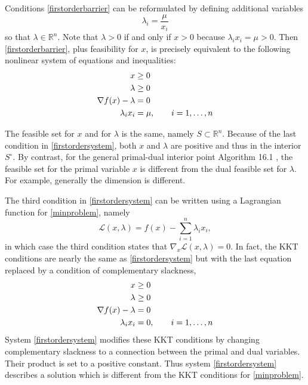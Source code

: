 \documentclass[11pt]{article}
\newcommand{\RR}{\mathbb{R}}
\newcommand{\grad}{\nabla}
\begin{document}
Conditions \eqref{firstorderbarrier} can be reformulated by defining additional variables
    $$\lambda_i = \frac{\mu}{x_i}$$
so that $\lambda\in\RR^n$.  Note that $\lambda>0$ if and only if $x>0$ because $\lambda_i x_i = \mu > 0$.  Then \eqref{firstorderbarrier}, plus feasibility for $x$, is precisely equivalent to the following nonlinear system of equations and inequalities:
\begin{align}
x &\ge 0 \label{firstordersystem} \\
\lambda &\ge 0 \notag \\
\grad f(x) - \lambda &= 0 \notag \\
\lambda_i x_i &= \mu, \qquad i=1,\dots,n \notag
\end{align}

The feasible set for $x$ and for $\lambda$ is the same, namely $S \subset \RR^n$.  Because of the last condition in \eqref{firstordersystem}, both $x$ and $\lambda$ are positive and thus in the interior $S^\circ$.  By contrast, for the general primal-dual interior point Algorithm 16.1 \cite[section 16.7]{GrivaNashSofer2009}, the feasible set for the primal variable $x$ is different from the dual feasible set for $\lambda$.  For example, generally the dimension is different.

The third condition in \eqref{firstordersystem} can be written using a Lagrangian function for \eqref{minproblem}, namely
\begin{equation}
\mathcal{L}(x,\lambda) = f(x) - \sum_{i=1}^n \lambda_i x_i,  \label{Lagrangian}
\end{equation}
in which case the third condition states that $\grad_x \mathcal{L}(x,\lambda)=0$.  In fact, the KKT conditions \cite[sections 14.4, 14.5]{GrivaNashSofer2009} are nearly the same as \eqref{firstordersystem} but with the last equation replaced by a condition of complementary slackness,
\begin{align}
x &\ge 0 \label{KKT} \\
\lambda &\ge 0 \notag \\
\grad f(x) - \lambda &= 0 \notag \\
\lambda_i x_i &= 0, \qquad i=1,\dots,n \notag
\end{align}
System \eqref{firstordersystem} modifies these KKT conditions by changing complementary slackness to a connection between the primal and dual variables.  Their product is set to a positive constant.  Thus system \eqref{firstordersystem} describes a solution which is different from the KKT conditions for \eqref{minproblem}.
\end{document}
